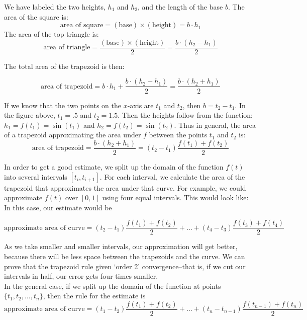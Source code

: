 \documentclass{article}
\begin{document}
We have labeled the two heights, $h_1$ and $h_2$, and the length of the base $b$.  The area of the square is:
\[\text{area of square} =(\text{base})\times(\text{height})=b\cdot h_1\]
The area of the top triangle is:
\[\text{area of triangle} = \frac{(\text{base})\times(\text{height})}{2}=\frac{b\cdot (h_2-h_1)}{2}\]

The total area of the trapezoid is then: 

\[\text{area of trapezoid}= b\cdot h_1 + \frac{b\cdot (h_2-h_1)}{2} = \frac{b\cdot (h_2+h_1)}{2}
\]

If we know that the two points on the $x$-axis are $t_1$ and $t_2$, then $b = t_2-t_1$.  In the figure above, $t_1 = .5$ and $t_2=1.5$.  Then the heights follow from the function: $h_1= f(t_1)=\sin(t_1)$ and $h_2= f(t_2)=\sin(t_2)$.  Thus in general, the area of a trapezoid approximating the area under $f$ between the points $t_1$ and $t_2$ is:
\begin{equation}
\label{trprule}
\text{area of trapezoid}=   \frac{b\cdot (h_2+h_1)}{2}=(t_2-t_1)\frac{f(t_1)+f(t_2)}{2}
\end{equation}


In order to get a good estimate, we split up the domain of the function $f(t)$ into several intervals $[t_i, t_{i+1}]$.  For each interval, we calculate the area of the trapezoid that approximates the area under that curve.  For example, we could approximate $f(t)$ over $[0,1]$ using four equal intervals.
This would look like:\\



In this case, our estimate would be 

\[\text{approximate area of curve} = (t_2-t_1)\frac{f(t_1)+f(t_2)}{2} + \dots + (t_4-t_3)\frac{f(t_3)+f(t_4)}{2}
\]


As we take smaller and smaller intervals, our approximation will get better, because there will be less space between the trapezoids and the curve.  We can prove that the trapezoid rule given `order 2' convergence--that is, if we cut our intervals in half, our error gets four times smaller.\\
  In the general case, if we split up the domain of the function at points $\{t_1,t_2,\dots,t_n\}$, then the rule for the estimate is
\begin{equation}
\text{approximate area of curve} = (t_{1}-t_2)\frac{f(t_1)+f(t_{2})}{2}+\dots + (t_{n}-t_{n-1})\frac{f(t_{n-1})+f(t_{n})}{2}
\label{eq:area}
\end{equation}
\end{document}
